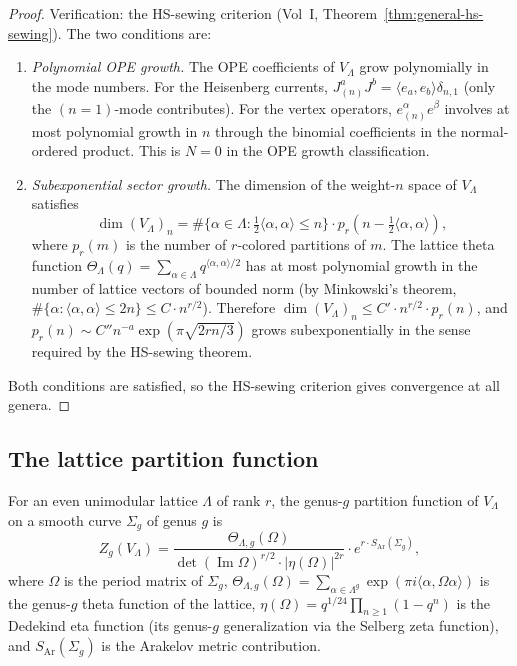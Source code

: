 \begin{proof}
Verification: the HS-sewing criterion
(Vol~I, Theorem~\ref*{thm:general-hs-sewing}).
The two conditions are:
\begin{enumerate}[leftmargin=2.4em]
\item \emph{Polynomial OPE growth.}
The OPE coefficients of $V_\Lambda$ grow polynomially in the mode numbers.
For the Heisenberg currents, $J^a_{(n)} J^b = \langle e_a,e_b\rangle
\delta_{n,1}$ (only the $(n=1)$-mode contributes). For the vertex
operators, $e^\alpha_{(n)} e^\beta$ involves at most polynomial growth
in $n$ through the binomial coefficients in the normal-ordered product.
This is $N=0$ in the OPE growth classification.

\item \emph{Subexponential sector growth.}
The dimension of the weight-$n$ space of $V_\Lambda$ satisfies
\[
\dim (V_\Lambda)_n
=
\#\{\alpha\in\Lambda : \tfrac{1}{2}\langle\alpha,\alpha\rangle \le n\}
\cdot p_r(n - \tfrac{1}{2}\langle\alpha,\alpha\rangle),
\]
where $p_r(m)$ is the number of $r$-colored partitions of $m$.
The lattice theta function $\Theta_\Lambda(q) = \sum_{\alpha\in\Lambda}
q^{\langle\alpha,\alpha\rangle/2}$ has at most polynomial growth in the
number of lattice vectors of bounded norm
(by Minkowski's theorem, $\#\{\alpha : \langle\alpha,\alpha\rangle \le 2n\}
\le C \cdot n^{r/2}$). Therefore
$\dim(V_\Lambda)_n \le C' \cdot n^{r/2}\cdot p_r(n)$,
and $p_r(n) \sim C''n^{-a}\exp(\pi\sqrt{2rn/3})$ grows subexponentially
in the sense required by the HS-sewing theorem.
\end{enumerate}
Both conditions are satisfied, so the HS-sewing criterion gives convergence
at all genera.
\end{proof}

\subsection{The lattice partition function}

\begin{theorem}
For an even unimodular lattice $\Lambda$ of rank $r$, the genus-$g$
partition function of $V_\Lambda$ on a smooth curve $\Sigma_g$ of
genus $g$ is
\begin{equation}%
Z_g(V_\Lambda)
=
\frac{\Theta_{\Lambda,g}(\Omega)}{\det(\operatorname{Im}\Omega)^{r/2}
\cdot |\eta(\Omega)|^{2r}}
\cdot e^{r\cdot S_{\mathrm{Ar}}(\Sigma_g)},
\end{equation}
where $\Omega$ is the period matrix of $\Sigma_g$,
$\Theta_{\Lambda,g}(\Omega) = \sum_{\alpha\in\Lambda^g}
\exp(\pi i \langle\alpha, \Omega\alpha\rangle)$
is the genus-$g$ theta function of the lattice,
$\eta(\Omega) = q^{1/24}\prod_{n \ge 1}(1-q^n)$ is the Dedekind eta function
(its genus-$g$ generalization via the Selberg zeta function),
and $S_{\mathrm{Ar}}(\Sigma_g)$ is the Arakelov metric contribution.
\end{theorem}

